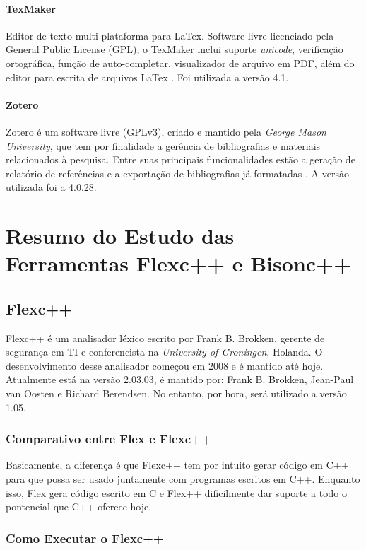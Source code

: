 \begin{apendicesenv}
\subsubsection{TexMaker}
Editor de texto multi-plataforma para LaTex. Software livre licenciado pela General Public License (GPL), o TexMaker inclui suporte \textit{unicode}, verificação ortográfica, função de auto-completar, visualizador de arquivo em PDF, além do editor para escrita de arquivos LaTex \cite{texmaker2014}. Foi utilizada a versão 4.1.

\subsubsection{Zotero}
Zotero é um software livre (GPLv3), criado e mantido pela \textit{George Mason University}, que tem por finalidade a gerência de bibliografias e materiais relacionados à pesquisa. Entre suas principais funcionalidades estão a geração de relatório de referências e a exportação de bibliografias já formatadas \cite{zotero2015}. A versão utilizada foi a 4.0.28.

\chapter{Resumo do Estudo das Ferramentas Flexc++ e Bisonc++}

\section{Flexc++}
Flexc++ é um analisador léxico escrito por Frank B. Brokken, gerente de segurança em TI e conferencista na \textit{University of Groningen}, Holanda. O desenvolvimento desse analisador começou em 2008 e é mantido até hoje. Atualmente está na versão 2.03.03, é mantido por: Frank B. Brokken, Jean-Paul van Oosten e Richard Berendsen. No entanto, por hora, será utilizado a versão 1.05.

\subsection{Comparativo entre Flex e Flexc++}
\par
\indent Basicamente, a diferença é que Flexc++ tem por intuito gerar código em C++ para que possa ser usado juntamente com programas escritos em C++. Enquanto isso, Flex gera código escrito em C e Flex++ dificilmente dar suporte a todo o pontencial que C++ oferece hoje.

\subsection{Como Executar o Flexc++}


\end{apendicesenv}

